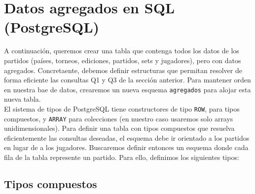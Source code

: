 



\section{Datos agregados en SQL (PostgreSQL)}

A continuación, queremos crear una tabla que contenga todos los datos de los partidos (países, torneos, ediciones, partidos, sets y jugadores), pero con datos agregados. Concretaente, debemos definir estructuras que permitan resolver de forma eficiente las consultas Q1 y Q3 de la sección anterior. Para mantener orden en nuestra bae de datos, crearemos un nueva esquema \texttt{agregados} para alojar esta nueva tabla. \\

El sistema de tipos de PostgreSQL tiene constructores de tipo \texttt{ROW}, para tipos compuestos, y \texttt{ARRAY} para colecciones (en nuestro caso usaremos solo arrays unidimensionales). Para definir una tabla con tipos compuestos que resuelva eficientemente las consultas deseadas, el esquema debe ir orientado a los partidos en lugar de a los jugadores. Buscaremos definir entonces un esquema donde cada fila de la tabla represente un partido. Para ello, definimos los siguientes tipos:

\subsection{Tipos compuestos}


